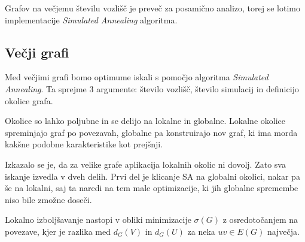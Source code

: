 \documentclass[ letterpaper, titlepage, fleqn]{article}
\begin{document}
Grafov na večjemu številu vozlišč je preveč za posamično analizo, torej
se lotimo implementacije {\em Simulated Annealing} algoritma.

\subsection{Večji grafi}

Med večjimi grafi bomo optimume iskali s pomočjo algoritma
{\em Simulated Annealing}. Ta sprejme 3 argumente: število vozlišč, število simulacij
in definicijo okolice grafa.

Okolice so lahko poljubne in se delijo na lokalne in globalne.
Lokalne okolice spreminjajo graf po povezavah, globalne pa
konstruirajo nov graf, ki ima morda kakšne podobne karakteristike kot prejšnji.

Izkazalo se je, da za velike grafe aplikacija lokalnih okolic ni dovolj. Zato
sva iskanje izvedla v dveh delih. Prvi del je klicanje SA na globalni okolici, nakar
pa še na lokalni, saj ta naredi na tem male optimizacije, ki jih globalne spremembe 
niso bile zmožne doseči.

Lokalno izboljšavanje nastopi v obliki minimizacije $\sigma(G)$ z osredotočanjem na
povezave, kjer je razlika med $d_G(V)$ in $d_G(U)$ za neka $uv \in E(G)$ največja.
\end{document}
